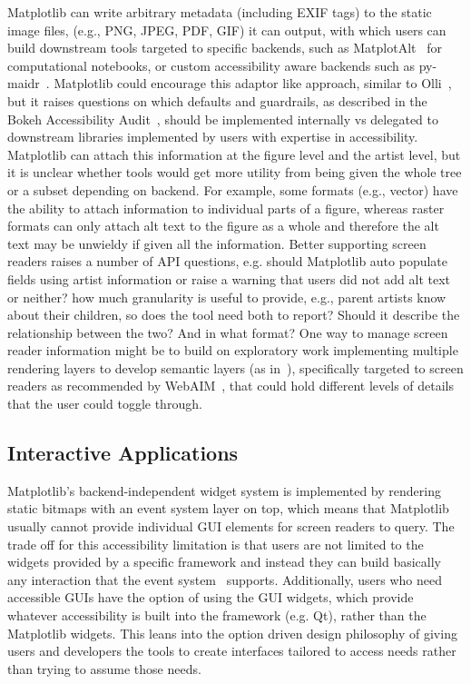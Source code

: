 \documentclass{vgtc}                          %
\begin{document}
Matplotlib can write arbitrary metadata (including EXIF tags) to the static image files, (e.g., PNG, JPEG, PDF, GIF) it can output, with which users can build downstream tools targeted to specific backends, such as MatplotAlt~\cite{nylundMatplotAltPythonLibrary2025} for computational notebooks, or custom accessibility aware backends such as py-maidr~\cite{PymaidrAccessibleData}. Matplotlib could encourage this adaptor like approach, similar to Olli~\cite{blancoOlliExtensibleVisualization}, but it raises questions on which defaults and guardrails, as described in the Bokeh Accessibility Audit~\cite{elavskyBokehAccessibilityAudit}, should be implemented internally vs delegated to downstream libraries implemented by users with expertise in accessibility. Matplotlib can attach this information at the figure level and the artist level, but it is unclear whether tools would get more utility from being given the whole tree or a subset depending on backend. For example, some formats (e.g., vector) have the ability to attach information to individual parts of a figure, whereas raster formats can only attach alt text to the figure as a whole and therefore the alt text may be unwieldy if given all the information. Better supporting screen readers raises a number of API questions, e.g. should Matplotlib auto populate fields using artist information or raise a warning that users did not add alt text or neither? how much granularity is useful to provide, e.g., parent artists know about their children, so does the tool need both to report? Should it describe the relationship between the two? And in what format? One way to manage screen reader information might be to build on exploratory work implementing multiple rendering layers to develop semantic layers (as in~\cite{plotnine}), specifically targeted to screen readers as recommended by WebAIM~\cite{WebAIMCSSAction}, that could hold different levels of details that the user could toggle through. 

\subsection{Interactive Applications}
Matplotlib's backend-independent widget system is implemented by rendering static bitmaps with an event system layer on top, which means that Matplotlib usually cannot provide individual GUI elements for screen readers to query. The trade off for this accessibility limitation is that users are not limited to the widgets provided by a specific framework and instead they can build basically any interaction that the event system~\cite{InteractiveFiguresAsynchronous} supports. Additionally, users who need accessible GUIs have the option of using the GUI widgets, which provide whatever accessibility is built into the framework (e.g. Qt), rather than the Matplotlib widgets. This leans into the option driven design philosophy of giving users and developers the tools to create interfaces tailored to access needs rather than trying to assume those needs.
\end{document}
